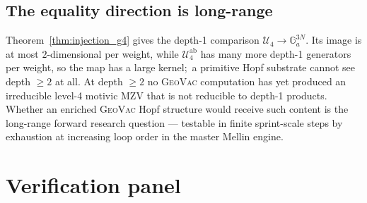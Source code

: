 \documentclass[11pt,a4paper]{article}
\theoremstyle{plain}
\theoremstyle{definition}
\newcommand{\Ga}{\mathbb{G}_{a}}
\begin{document}
\subsection{The equality direction is long-range}\label{sec:equality_multi_year}

Theorem~\ref{thm:injection_g4} gives the depth-1 comparison
$\mathcal{U}_{4} \to \Ga^{3N}$. Its image is at most $2$-dimensional per
weight, while $\mathcal{U}_{4}^{\mathrm{ab}}$ has many more depth-1
generators per weight, so the map has a large kernel;\ a primitive Hopf
substrate cannot see depth $\ge 2$ at all. At depth $\ge 2$ no
\textsc{GeoVac} computation has yet produced an irreducible level-4 motivic
MZV that is not reducible to depth-1 products. Whether an enriched
\textsc{GeoVac} Hopf structure would receive such content is the long-range
forward research question --- testable in finite sprint-scale steps by
exhaustion at increasing loop order in the master Mellin engine.

\section{Verification panel}\label{sec:verification}
\end{document}
